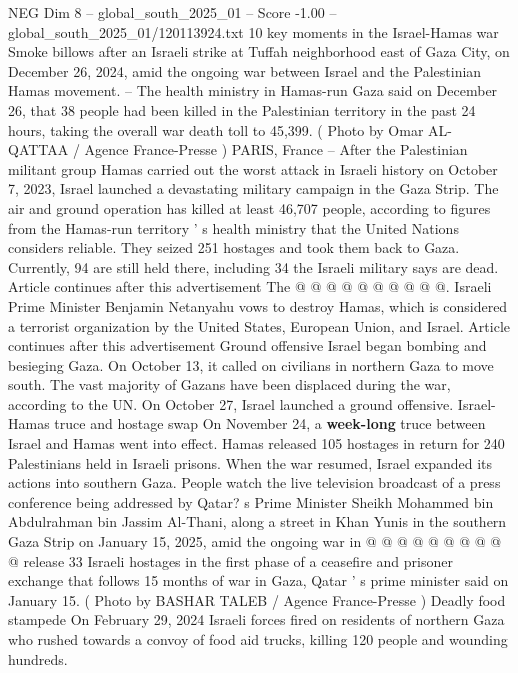 \begin{textsample}{NEG Dim 8 – global\_south\_2025\_01 – Score -1.00 – global\_south\_2025\_01/120113924.txt}  \label{ex:f8_neg_330}
10 key moments in the Israel-Hamas war Smoke billows after an Israeli strike at Tuffah neighborhood east of Gaza City, on December 26, 2024, amid the ongoing war between Israel and the Palestinian Hamas movement. -- The health ministry in Hamas-run Gaza said on December 26, that 38 people had been killed in the Palestinian territory in the past 24 hours, taking the overall war death toll to 45,399. ( Photo by Omar AL-QATTAA / Agence France-Presse ) PARIS, France -- After the Palestinian militant group Hamas carried out the worst attack in Israeli history on October 7, 2023, Israel launched a devastating military campaign in the Gaza Strip.
The air and ground operation has killed at least 46,707 people, according to figures from the Hamas-run territory ' s health ministry that the United Nations considers reliable.
They seized 251 hostages and took them back to Gaza.
Currently, 94 are still held there, including 34 the Israeli military says are dead.
Article continues after this advertisement The @ @ @ @ @ @ @ @ @ @.
Israeli Prime Minister Benjamin Netanyahu vows to destroy Hamas, which is considered a terrorist organization by the United States, European Union, and Israel.
Article continues after this advertisement Ground offensive Israel began bombing and besieging Gaza.
On October 13, it called on civilians in northern Gaza to move south.
The vast majority of Gazans have been displaced during the war, according to the UN.
On October 27, Israel launched a ground offensive.
Israel-Hamas truce and hostage swap On November 24, a \textbf{week-long} truce between Israel and Hamas went into effect.
Hamas released 105 hostages in return for 240 Palestinians held in Israeli prisons.
When the war resumed, Israel expanded its actions into southern Gaza.
People watch the live television broadcast of a press conference being addressed by Qatar? s Prime Minister Sheikh Mohammed bin Abdulrahman bin Jassim Al-Thani, along a street in Khan Yunis in the southern Gaza Strip on January 15, 2025, amid the ongoing war in @ @ @ @ @ @ @ @ @ @ release 33 Israeli hostages in the first phase of a ceasefire and prisoner exchange that follows 15 months of war in Gaza, Qatar ' s prime minister said on January 15. ( Photo by BASHAR TALEB / Agence France-Presse ) Deadly food stampede On February 29, 2024 Israeli forces fired on residents of northern Gaza who rushed towards a convoy of food aid trucks, killing 120 people and wounding hundreds.

\end{textsample}
